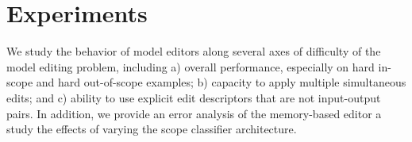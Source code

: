 

\section{Experiments}
\label{sec:expts}
We study the behavior of model editors along several axes of difficulty of the model editing problem, including a) overall performance, especially on hard in-scope and hard out-of-scope examples; b) capacity to apply multiple simultaneous edits; and c) ability to use explicit edit descriptors that are not input-output pairs. In addition, we provide an error analysis of the memory-based editor a study the effects of varying the scope classifier architecture.


